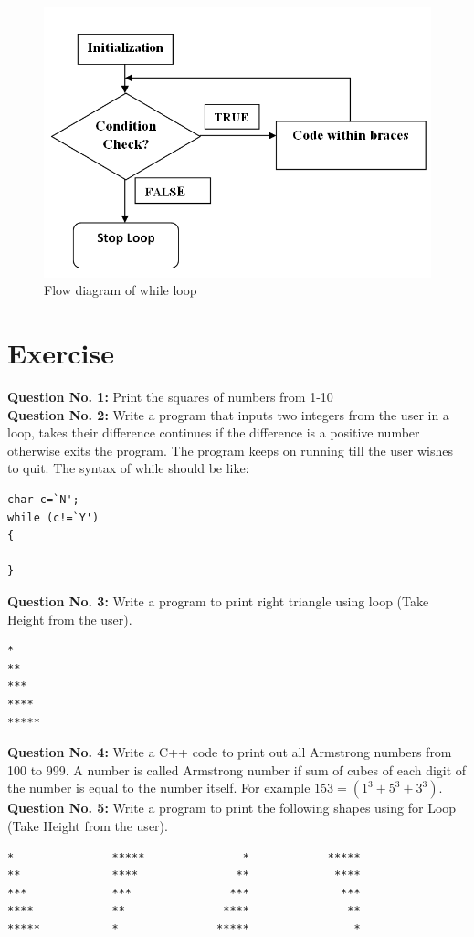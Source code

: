 \documentclass[12pt,a4paper]{article}
\begin{document}
\begin{figure}[H]
\centering
\label{While-Loop-Flow-Diagram}
\includegraphics[width=1.0\textwidth]{FlowDiagramWhileLoop.png}
\caption{Flow diagram of while loop}
\end{figure}

\section{Exercise}
\textbf{Question No. 1:} Print the squares of numbers from 1-10\\
\noindent\textbf{Question No. 2:} Write a program that inputs two integers from the user in a loop, takes their difference continues if the difference is a positive number otherwise exits the program. The program keeps on running till the user wishes to quit. 
The syntax of while should be like:
\begin{verbatim}
char c=`N';
while (c!=`Y')
{

}
\end{verbatim}
\noindent\textbf{Question No. 3:} Write a program to print right triangle using loop (Take Height from the user).
\begin{verbatim}
*
**
***
****
*****
\end{verbatim}
\noindent\textbf{Question No. 4:} Write a C++ code to print out all Armstrong numbers from 100 to 999. A number is called Armstrong number if sum of cubes of each digit of the number is equal to the number itself. For example $153=(1^3+5^3+3^3)$.
\newpage
\noindent\textbf{Question No. 5:} Write a program to print the following shapes using for Loop (Take Height from the user). 

\begin{verbatim}
*           	*****               *       	 *****
**          	****               **       	  ****
***         	***               ***       	   ***
****        	**               ****       	    **
*****       	*               *****       	     *
\end{verbatim}
\end{document}
